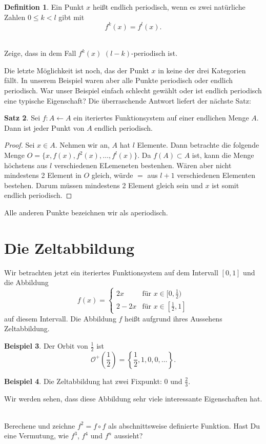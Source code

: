 \documentclass[a4paper,ngerman,12pt]{zirkelblatt1415}
\theoremstyle{definition}
\newtheorem{definition}{Definition}
\newtheorem{satz}[definition]{Satz}
\newtheorem{beispiel}[definition]{Beispiel}
\theoremstyle{remark}
\begin{document}
\begin{definition}
Ein  Punkt $x$ heißt endlich periodisch, wenn es zwei natürliche Zahlen $0\leq k < l$ gibt mit
\[
f^k(x) = f^l(x).
\]
\end{definition}
\begin{aufgabe}\\
Zeige, dass in dem Fall $f^k(x)$ $(l-k)$-periodisch ist.
\end{aufgabe}
Die letzte Möglichkeit ist noch, das der Punkt $x$ in keine der drei Kategorien fällt. In unserem Beispiel waren aber alle Punkte periodisch oder endlich periodisch. War unser Beispiel einfach schlecht gewählt oder ist endlich periodisch eine typische Eigenschaft? Die überraschende Antwort liefert der nächste Satz:
\begin{satz}
Sei $f:A\longleftarrow A$ ein iteriertes Funktionsystem auf einer endlichen Menge $A$. Dann ist jeder Punkt von $A$ endlich periodisch.
\end{satz}
\begin{proof}
Sei $x\in A$. Nehmen wir an, $A$ hat $l$ Elemente. Dann betrachte die folgende Menge $O = \{x, f(x), f^2(x),\ldots, f^l(x)\}$. Da $f(A)\subset A$ ist, kann die Menge höchstens aus $l$ verschiedenen ELemeneten bestenhen. Wären aber nicht mindestens 2 Element in $O$ gleich, würde $=$ aus $l+1$ verschiedenen Elementen bestehen. Darum müssen mindestens 2 Element gleich sein und $x$ ist somit endlich periodisch.
\end{proof}
Alle anderen Punkte bezeichnen wir als aperiodisch.

\section{Die Zeltabbildung}
Wir betrachten jetzt ein iteriertes Funktionsystem auf dem Intervall $[0,1]$ und die Abbildung 
\[
f(x) = \begin{cases}
        2x & \text{für } x\in[0,\frac{1}{2}) \\
        2-2x & \text{für } x\in[\frac{1}{2},1]
       \end{cases} 
\]
auf diesem Intervall. Die Abbildung $f$ heißt aufgrund ihres Aussehens Zeltabbildung.
\begin{figure}
 
\end{figure}


\begin{beispiel}
Der Orbit von $\frac{1}{2}$ ist 
\[
 \mathcal{O}^+\left(\frac{1}{2}\right)=\left\{\frac{1}{2},1,0,0,\ldots \right\}.
\]
\end{beispiel}
\begin{beispiel}
Die Zeltabbildung hat zwei Fixpunkt: $0$ und $\frac{2}{3}$.
\end{beispiel}
Wir werden sehen, dass diese Abbildung sehr viele interessante Eigenschaften hat.
\begin{aufgabe}\\
Berechene und zeichne $f^2=f\circ f$ als abschnittsweise definierte Funktion. Hast Du eine Vermutung, wie $f^3$, $f^4$ und $f^n$ aussieht? 
\end{aufgabe}
\end{document}
